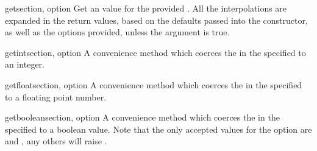 \begin{methoddesc}{get}{section, option}
Get an  value for the provided .  All the
\samp{\%} interpolations are expanded in the return values, based on
the defaults passed into the constructor, as well as the options
 provided, unless the  argument is true.
\end{methoddesc}

\begin{methoddesc}{getint}{section, option}
A convenience method which coerces the  in the specified
 to an integer.
\end{methoddesc}

\begin{methoddesc}{getfloat}{section, option}
A convenience method which coerces the  in the specified
 to a floating point number.
\end{methoddesc}

\begin{methoddesc}{getboolean}{section, option}
A convenience method which coerces the  in the specified
 to a boolean value.  Note that the only accepted values
for the option are  and , any others will raise
.
\end{methoddesc}
